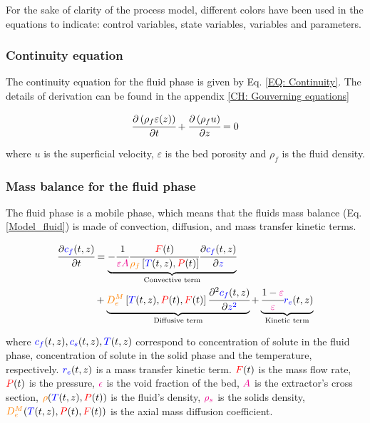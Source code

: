 \documentclass[../Parameter_fitting.tex]{subfiles}
\begin{document}
	For the sake of clarity of the process model, different colors have been used in the equations to indicate: 
	{\color{red}control variables},
	{\color{blue}state variables},
	{\color{orange}variables} and
	{\color{magenta}parameters}.
	
	\subsubsection{Continuity equation} \label{CH: Continuity}
	The continuity equation for the fluid phase is given by Eq. \ref{EQ: Continuity}. The details of derivation can be found in the appendix \ref{CH: Gouverning equations}
	
	{\footnotesize
		\begin{equation}
			\cfrac{\partial \left( \rho_f \varepsilon (z) \right)}{\partial t} + \cfrac{\partial \left( \rho_f u \right)}{\partial z} = 0
			\label{EQ: Continuity}
		\end{equation}
	}

	where $u$ is the superficial velocity, $\varepsilon$ is the bed porosity and $\rho_f$ is the fluid density. 
	
	\subsubsection{Mass balance for the fluid phase} \label{CH: Mass_balance_fluid}
	The fluid phase is a mobile phase, which means that the fluids mass balance (Eq. \ref{Model_fluid}) is made of convection, diffusion, and mass transfer kinetic terms.
	
	{\footnotesize
		\begin{align} 
			\label{Model_fluid}
			\cfrac{\partial {\color{blue}c_f}(t,z)}{\partial t} &	=  \underbrace{-\cfrac{1}{ {\color{magenta}\varepsilon A}}\cfrac{{\color{red}F}(t)}{{\color{orange}\rho_f}\left[{\color{blue}T}(t,z),{\color{red}P}(t)\right]} \cfrac{\partial {\color{blue}c_f}(t,z)}{\partial {\color{blue}z}}}_{\text{Convective term}} \nonumber \\
			&+ \underbrace{ {\color{orange}D^M_e}\left[{\color{blue}T}(t,z),{\color{red}P}(t),{\color{red}F}(t)\right] \cfrac{\partial^2 {\color{blue}c_f}(t,z)}{\partial {\color{blue}z^2}} }_{\text{Diffusive term}} 
			+ \underbrace{ \cfrac{1-{\color{magenta}\varepsilon}}{{\color{magenta}\varepsilon}} {\color{blue}r_e}(t,z) }_{\text{Kinetic term}} 
	\end{align} }
	
	where ${\color{blue}c_f}(t,z), {\color{blue}c_s}(t,z), {\color{blue}T}(t,z)$ correspond to concentration of solute in the fluid phase, concentration of solute in the solid phase and the temperature, respectively. ${\color{blue}r_e}(t,z)$ is a mass transfer kinetic term. ${\color{red}F}(t)$ is the mass flow rate, ${\color{red}P}(t)$ is the pressure, ${\color{magenta}\epsilon}$ is the void fraction of the bed, ${\color{magenta}A}$ is the extractor’s cross section, ${\color{orange}\rho}({\color{blue}T}(t,z),{\color{red}P}(t))$ is the fluid's density, ${\color{magenta}\rho_s}$ is the solids density, ${\color{orange}D^M_e}({\color{blue}T}(t,z),{\color{red}P}(t),{\color{red}F}(t))$ is the axial mass diffusion coefficient.
	
\end{document}
